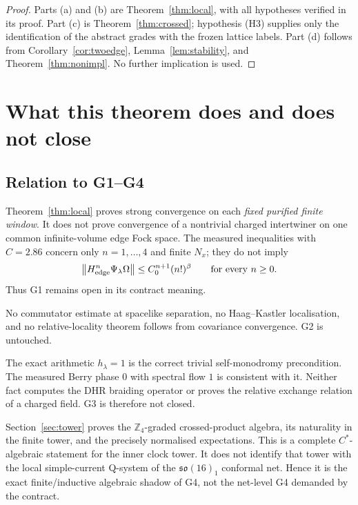 \begin{proof}
Parts (a) and (b) are Theorem~\ref{thm:local}, with all hypotheses
verified in its proof.  Part (c) is Theorem~\ref{thm:crossed}; hypothesis
(H3) supplies only the identification of the abstract grades with the
frozen lattice labels.  Part (d) follows from
Corollary~\ref{cor:twoedge}, Lemma~\ref{lem:stability}, and
Theorem~\ref{thm:nonimpl}.  No further implication is used.
\end{proof}

\section{What this theorem does and does not close}

\subsection{Relation to G1--G4}

\begin{description}[style=nextline]
\item[G1: convergence on the finite-particle core with energy bounds.]
Theorem~\ref{thm:local} proves strong convergence on each
\emph{fixed purified finite window}.  It does not prove convergence of
a nontrivial charged intertwiner on one common infinite-volume edge Fock
space.  The measured inequalities with $C=2.86$ concern only
$n=1,\ldots,4$ and finite $N_x$; they do not imply
\[
\left\lVert H_{\mathrm{edge}}^n\Psi_\lambda\Omega\right\rVert
\le C_0^{n+1}(n!)^\beta\qquad\text{for every }n\ge0.
\]
Thus G1 remains open in its contract meaning.

\item[G2: locality relative to the bilinear net.]
No commutator estimate at spacelike separation, no Haag--Kastler
localisation, and no relative-locality theorem follows from covariance
convergence.  G2 is untouched.

\item[G3: braiding and monodromy.]
The exact arithmetic $h_\lambda=1$ is the correct trivial
self-monodromy precondition.  The measured Berry phase $0$ with spectral
flow $1$ is consistent with it.  Neither fact computes the DHR braiding
operator or proves the relative exchange relation of a charged field.
G3 is therefore not closed.

\item[G4: Q-system closure.]
Section~\ref{sec:tower} proves the $\mathbb Z_4$-graded crossed-product
algebra, its naturality in the finite tower, and the precisely normalised
expectations.  This is a complete $C^*$-algebraic statement for the inner
clock tower.  It does not identify that tower with the local
simple-current Q-system of the $\mathfrak{so}(16)_1$ conformal net.
Hence it is the exact finite/inductive algebraic shadow of G4, not the
net-level G4 demanded by the contract.
\end{description}

